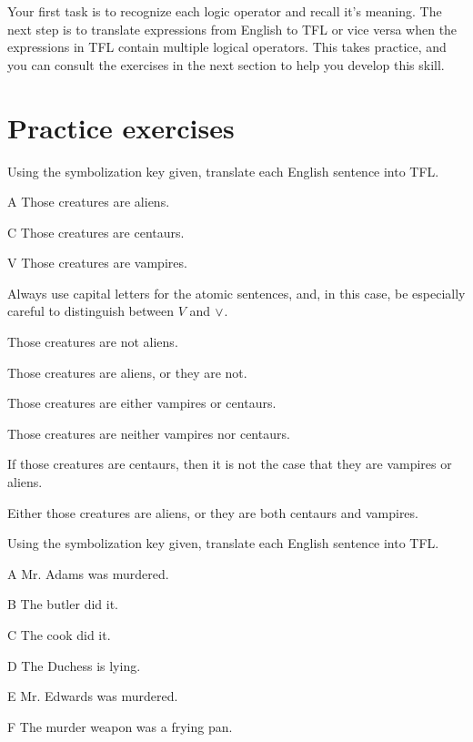 \noindent Your first task is to recognize each logic operator and recall it's meaning. The next step is to translate expressions from English to TFL or vice versa when the expressions in TFL contain multiple logical operators. This takes practice, and you can consult the exercises in the next section to help you develop this skill.





\section{Practice exercises}
\setcounter{ProbPart}{0}

\problempart Using the symbolization key given, translate each English sentence into TFL.\label{pr.monkeysuits}
	\begin{ekey}
		\item[A] Those creatures are aliens. 
		\item[C] Those creatures are centaurs. 
		\item[V] Those creatures are vampires.
	\end{ekey}
Always use capital letters for the atomic sentences, and, in this case, be especially careful to distinguish between $V$ and $\vee$.

\begin{earg}
\item Those creatures are not aliens.
\item Those creatures are aliens, or they are not.
\item Those creatures are either vampires or centaurs.
\item Those creatures are neither vampires nor centaurs.
\item If those creatures are centaurs, then it is not the case that they are vampires or aliens.
\item Either those creatures are aliens, or they are both centaurs and vampires.
\end{earg}

\problempart Using the symbolization key given, translate each English sentence into TFL.
\begin{ekey}
\item[A] Mr. Adams was murdered.
\item[B] The butler did it.
\item[C] The cook did it.
\item[D] The Duchess is lying.
\item[E] Mr. Edwards was murdered.
\item[F] The murder weapon was a frying pan.
\end{ekey}

